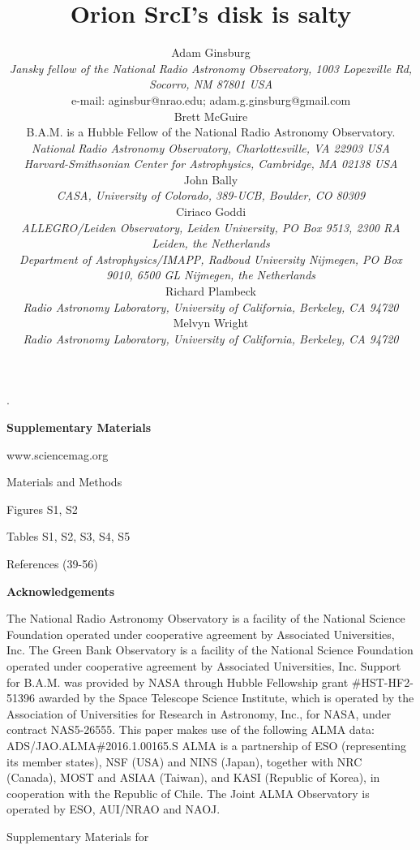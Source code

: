 \documentclass[12pt]{article}
\newcounter{lastnote}
\newenvironment{scilastnote}{%
\setcounter{lastnote}{\value{enumiv}}%
\addtocounter{lastnote}{+1}%
\begin{list}%
{\arabic{lastnote}.}
{\setlength{\leftmargin}{.22in}}
{\setlength{\labelsep}{.5em}}}
{\end{list}}
\newcommand{\nraojansky}{\footnotesize{\it{Jansky fellow of the National Radio Astronomy Observatory, 1003 Lopezville Rd, Socorro, NM 87801 USA }}}
\newcommand{\nraocv}{\footnotesize{\it{National Radio Astronomy Observatory, Charlottesville, VA 22903 USA }}}
\newcommand{\cfa}{\footnotesize{\it{Harvard-Smithsonian Center for Astrophysics, Cambridge, MA 02138 USA }}}
\newcommand{\hubble}{\footnotesize{B.A.M. is a Hubble Fellow of the National Radio Astronomy Observatory.}}
\newcommand{\radboud}{\footnotesize{\it{Department of Astrophysics/IMAPP, Radboud University Nijmegen, PO Box 9010, 6500 GL Nijmegen, the Netherlands}}}
\newcommand{\allegro}{\footnotesize{\it{ALLEGRO/Leiden Observatory, Leiden University, PO Box 9513, 2300 RA Leiden, the Netherlands}}}
\newcommand{\casa}{\footnotesize{\it{CASA, University of Colorado, 389-UCB, Boulder, CO 80309}} }
\newcommand{\berkeley}{\footnotesize{\it{Radio Astronomy Laboratory, University of California, Berkeley, CA 94720}} }
\newcommand{\sourcei}{SrcI\xspace}
\begin{document}
\begin{scilastnote}
\item[] \textbf{Supplementary Materials}

www.sciencemag.org

Materials and Methods

Figures S1, S2

Tables S1, S2, S3, S4, S5

References (39-56)

\item[] \textbf{Acknowledgements}
\item[] 
The National Radio Astronomy Observatory is a facility of the National Science
Foundation operated under cooperative agreement by Associated Universities,
Inc. The Green Bank Observatory is a facility of the National Science
Foundation operated under cooperative agreement by Associated Universities,
Inc. Support for B.A.M. was provided by NASA through Hubble Fellowship grant
\#HST-HF2-51396 awarded by the Space Telescope Science Institute, which is
operated by the Association of Universities for Research in Astronomy, Inc.,
for NASA, under contract NAS5-26555. 
This paper makes use of the following ALMA data: ADS/JAO.ALMA\#2016.1.00165.S
ALMA is a partnership of ESO (representing its member states), NSF (USA) and
NINS (Japan), together with NRC (Canada), MOST and ASIAA (Taiwan), and KASI
(Republic of Korea), in cooperation with the Republic of Chile. The Joint ALMA
Observatory is operated by ESO, AUI/NRAO and NAOJ.



\clearpage

Supplementary Materials for


\title{Orion \sourcei's disk is salty}

\author{
Adam Ginsburg\\
\nraojansky\\
e-mail: aginsbur@nrao.edu; adam.g.ginsburg@gmail.com\\
Brett McGuire\\
\hubble\\
\nraocv\\
\cfa\\
John Bally\\
\casa\\
Ciriaco Goddi\\
\allegro\\
\radboud\\
Richard Plambeck\\
\berkeley\\
Melvyn Wright\\
\berkeley\\
}




\end{scilastnote}
\end{document}
